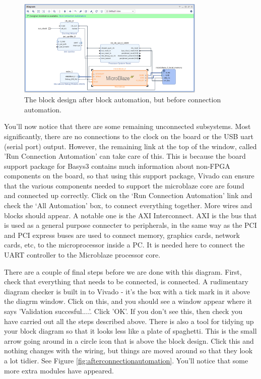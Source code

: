 \documentclass[../physical_computing.tex]{subfiles}
\begin{document}
\begin{figure}[h!]
    \centering
    \includegraphics[width=0.8\textwidth]{figures/afterblockautomation.png}
    \caption{The block design after block automation, but before connection automation.}
    \label{fig:afterblockautomation}
\end{figure}

You'll now notice that there are some remaining unconnected subsystems. Most significantly, there are no connections to the clock on the 
board or the USB uart (serial port) output. However, the remaining link at the top of the window, called 'Run Connection Automation' can
take care of this. This is because the board support package for Basys3 contains much information about non-FPGA components on the board, 
so that using this support package, Vivado can ensure that the various components needed to support the microblaze core are found
and connected up correctly. Click on the `Run Connection Automation' link and check the `All Automation' box, to connect everything together.
More wires and blocks should appear. A notable one is the AXI Interconnect. AXI is the bus that is used as a general purpose connecter to peripherals, in 
the same way as the PCI and PCI express buses are used to connect memory, graphics cards, network cards, etc, to the microprocessor inside 
a PC. It is needed here to connect the UART controller to the Microblaze processor core.

There are a couple of final steps before we are done with this diagram. First, check that everything that needs to be connected, is connected.
A rudimentary diagram checker is built in to Vivado - it's the box with a tick mark in it above the diagrm window. Click on this, and you should
see a window appear where it says 'Validation succesful....'. Click 'OK'. If you don't  see this, then check you have carried out all the 
steps described above. There is also a tool for tidying up your block diagram so that it looks less like a plate of spaghetti. This is
the small arrow going around in a circle icon that is above the block design. Click this and nothing changes with the wiring, but things
are moved around so that they look a lot tidier. See Figure \ref{fig:afterconnectionautomation}. You'll notice that some more extra
modules have appeared. 
\end{document}
